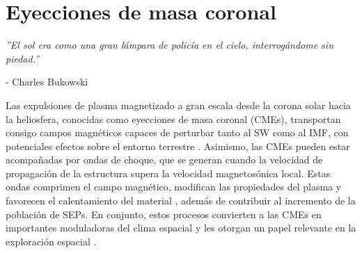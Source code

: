 \chapter{Eyecciones de masa coronal}
\label{CME}
\begin{flushright}
\begin{minipage}{0.6\textwidth}
\raggedleft  %
\footnotesize\itshape
\setlength{\baselineskip}{12pt} 
\vspace{0.3cm} 
''El sol era como una gran lámpara de policía en el cielo, interrogándome sin piedad.''

\medskip
\vspace{0.3cm} 
- Charles Bukowski
\end{minipage}
\end{flushright}
\vspace{1cm}


Las expulsiones de plasma magnetizado a gran escala desde la corona solar hacia la heliosfera, conocidas como eyecciones de masa coronal (CMEs), transportan consigo campos magnéticos capaces de perturbar tanto al \ac{SW} como al \ac{IMF}, con potenciales efectos sobre el entorno terrestre \parencite[e.g.,][]{vrsnak-2012, subramanian-2016, gopalswamy-2000, lugaz-2017}. Asimismo, las \acp{CME} pueden estar acompañadas por ondas de choque, que se generan cuando la velocidad de propagación de la estructura supera la velocidad magnetosónica local. Estas ondas comprimen el campo magnético, modifican las propiedades del plasma y favorecen el calentamiento del material \parencite[e.g.,][]{gosling-1976, sonett-1964, gosling-1993}, además de contribuir al incremento de la población de \acp{SEP}. En conjunto, estos procesos convierten a las \acp{CME} en importantes moduladoras del clima espacial \parencite[e.g.,][]{2014swcm.book.....H, nhess-2018-92} y les otorgan un papel relevante en la exploración espacial \parencite[e.g.,][]{kahler-1978, kahler-1983, mewaldt-2007, reames-2013, usoskin-2017}.

